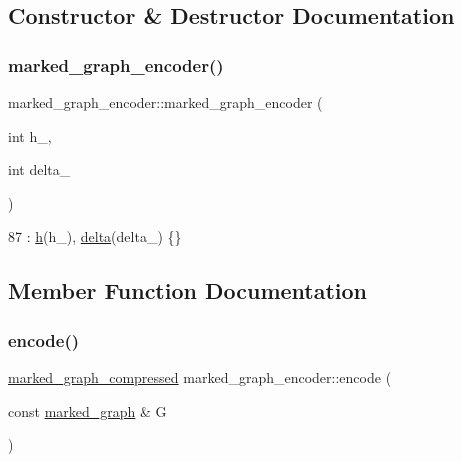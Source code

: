 \subsection{Constructor \& Destructor Documentation}
\mbox{\label{classmarked__graph__encoder_a128d2a38b23ce620c77d00a5eff487ea}} 
\subsubsection{\texorpdfstring{marked\+\_\+graph\+\_\+encoder()}{marked\_graph\_encoder()}}
{\footnotesize\ttfamily marked\+\_\+graph\+\_\+encoder\+::marked\+\_\+graph\+\_\+encoder (\begin{DoxyParamCaption}\item[{int}]{h\+\_\+,  }\item[{int}]{delta\+\_\+ }\end{DoxyParamCaption})\hspace{0.3cm}{\ttfamily [inline]}}


\begin{DoxyCode}
87 : \hyperlink{classmarked__graph__encoder_ae7f8872c57d2d64e4ca6cc47387b9b58}{h}(h\_), \hyperlink{classmarked__graph__encoder_a29dcf42526b12cf7964a556bb1025c9b}{delta}(delta\_) \{\}
\end{DoxyCode}


\subsection{Member Function Documentation}
\mbox{\label{classmarked__graph__encoder_aa7fa19a225dd9b31d6fef9583fab8cf1}} 
\subsubsection{\texorpdfstring{encode()}{encode()}}
{\footnotesize\ttfamily \hyperlink{classmarked__graph__compressed}{marked\+\_\+graph\+\_\+compressed} marked\+\_\+graph\+\_\+encoder\+::encode (\begin{DoxyParamCaption}\item[{const \hyperlink{classmarked__graph}{marked\+\_\+graph} \&}]{G }\end{DoxyParamCaption})}


